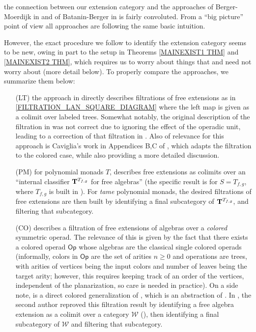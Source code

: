 \documentclass{article}
\begin{document}
the connection between our extension category and the approaches 
of Berger-Moerdijk in \cite{BM03}
and of Batanin-Berger in \cite{BB17}
is fairly convoluted.
From a ``big picture'' point of view all approaches 
are following the same basic intuition. 

However, the exact procedure we follow to identify 
the extension category seems to be new,
owing in part to the setup in 
Theorems \ref{MAINEXIST1 THM} and \ref{MAINEXIST2 THM},
which requires us to worry about things that 
\cite{BM03} and \cite{BB17} need not worry about
(more detail below).
To properly compare the approaches, we summarize them below:
\begin{itemize}
	\item[(LT)] the approach in 
	\cite[\S 5.11]{BM03}
	directly describes filtrations of free extensions as in
	\eqref{FILTRATION_LAN_SQUARE_DIAGRAM}
	where the left map is given as a colimit over labeled trees.
	Somewhat notably, the original description of 
	the filtration in \cite[\S 5.11]{BM03}
	was not correct due to ignoring the effect of the operadic unit,
	leading to a correction of that filtration in 
	\cite{BM09}.
	Also of relevance for this approach is Caviglia's work in Appendices B,C of \cite{Cav},
	which adapts the \cite{BM03} filtration 
	to the colored case, while also providing a more detailed discussion.
	\item[(PM)] 
	for polynomial monads $T$, \cite{BB17} describes free extensions as colimits over
	an ``internal classifier 
	$\bold{T}^{T_{f,g}}$ for free algebras''
	(the specific result is \cite[Thm. 6.17]{BB17}
	for $S = T_{f,g}$, where 
	$T_{f,g}$ is built in \cite[\S 7]{BB17}).
	For \emph{tame} polynomial monads, 
	the desired filtrations of free extensions are then 
	built by identifying a final subcategory of
	$\bold{T}^{T_{f,g}}$,
	and filtering that subcategory.
	\item[(CO)]
	\cite[Prop. 4.3.16]{WY18} describes a filtration 
	of free extensions of algebras over a 
	\emph{colored} symmetric operad. 
	The relevance of this is given by
	the fact that there exists a colored operad
	$\mathsf{Op}$ whose algebras are the classical single colored operads
	(informally, colors in $\mathsf{Op}$
	are the set of arities $n \geq 0$
	and operations are trees, with arities of vertices being the input colors and number of leaves being the target arity;
	however, this requires keeping track of an order of the vertices, independent of the planarization,
	so care is needed in practice).
	On a side note,
	\cite[Prop. 4.3.16]{WY18} is a 
	direct colored generalization
	of \cite[(7.12)]{Ha10},
	which is an abstraction of 
	\cite[Prop. 4.20]{Ha10}.
	In \cite[Prop. 5.20]{Pe16},
	the second author reproved this filtration result by identifying a free algebra extension
	as a colimit over a category $\mathcal{W}$
	(\cite[Def. 5.26]{Pe16}),
	then identifying a final subcategory of $\mathcal{W}$
	and filtering that subcategory.
\end{itemize}	
\end{document}

